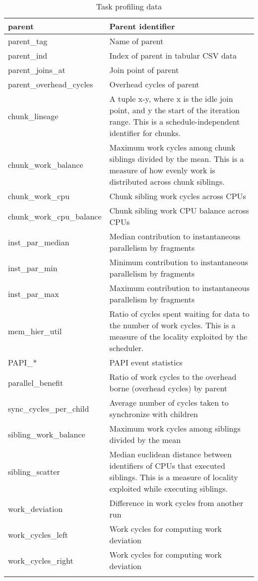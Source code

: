 \documentclass[11pt,a4paper]{article}
\begin{document}
\begin{appendices}
\begin{longtable}{|p{4cm}|p{7cm}|}
    parent & Parent identifier \\ \hline
    parent\_tag & Name of parent \\ \hline
    parent\_ind & Index of parent in tabular CSV data \\ \hline
    parent\_joins\_at & Join point of parent \\ \hline
    parent\_overhead\_cycles & Overhead cycles of parent \\ \hline
    chunk\_lineage & A tuple x-y, where x is the idle join point, and y the start of the iteration range.  This is a schedule-independent identifier for chunks. \\ \hline
    chunk\_work\_balance & Maximum work cycles among chunk siblings divided by the mean. This is a measure of how evenly work is distributed across chunk siblings. \\ \hline
    chunk\_work\_cpu & Chunk sibling work cycles across CPUs \\ \hline
    chunk\_work\_cpu\_balance & Chunk sibling work CPU balance across CPUs \\ \hline
    inst\_par\_median & Median contribution to instantaneous parallelism by fragments \\ \hline
    inst\_par\_min & Minimum contribution to instantaneous parallelism by fragments \\ \hline
    inst\_par\_max & Maximum contribution to instantaneous parallelism by fragments \\ \hline
    mem\_hier\_util & Ratio of cycles spent waiting for data to the number of work cycles. This is a measure of the locality exploited by the scheduler. \\ \hline
    PAPI\_* & PAPI event statistics \\ \hline
    parallel\_benefit & Ratio of work cycles to the overhead borne (overhead cycles) by parent \\ \hline
    sync\_cycles\_per\_child & Average number of cycles taken to synchronize with children \\ \hline
    sibling\_work\_balance & Maximum work cycles among siblings divided by the mean \\ \hline
    sibling\_scatter & Median euclidean distance between identifiers of CPUs that executed siblings. This is a measure of locality exploited while executing siblings. \\ \hline
    work\_deviation & Difference in work cycles from another run \\ \hline
    work\_cycles\_left & Work cycles for computing work deviation \\ \hline
    work\_cycles\_right & Work cycles for computing work deviation \\ \hline
    \caption{Task profiling data}
    \label{tab:task-prof-data}
\end{longtable}

\end{appendices}
\end{document}
